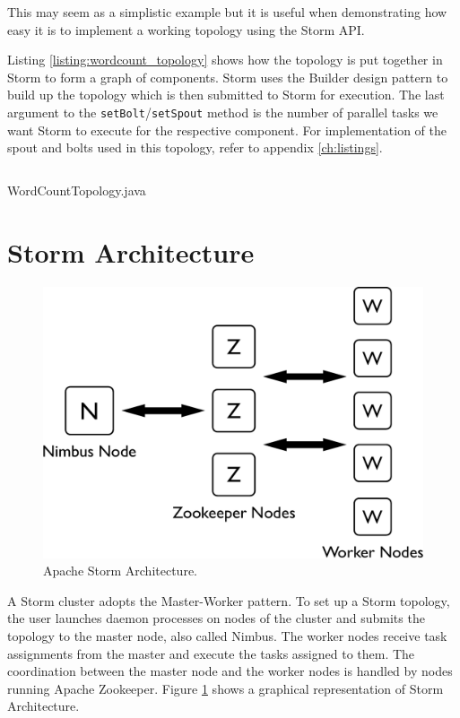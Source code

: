 \documentclass[bsc,logo,frontabs,twoside,singlespacing,normalheadings,parskip]{infthesis}\usepackage[]{graphicx}\usepackage[]{color}
\begin{document}
This may seem as a simplistic example but it is useful when demonstrating how easy it is to implement a working topology using the Storm API.

Listing \ref{listing:wordcount_topology} shows how the topology is put together in Storm to form a graph of components. Storm uses the Builder design pattern \citep{gamma1994design} to build up the topology which is then submitted to Storm for execution. The last argument to the \texttt{setBolt}/\texttt{setSpout} method is the number of parallel tasks we want Storm to execute for the respective component. For implementation of the spout and bolts used in this topology, refer to appendix \ref{ch:listings}.

\begin{listing}[!htb]
\inputminted{java}{code/WordCountTopology.java}
\caption{WordCountTopology.java}
\label{listing:wordcount_topology}
\end{listing}

\section{Storm Architecture}
\label{sec:storm_arch}

\begin{figure}[!htb]
	\centering
	\includegraphics[scale=0.4]{pdf/storm_arch.pdf}
	\caption{Apache Storm Architecture.}
	\label{fig:storm_arch}
\end{figure}


A Storm cluster adopts the Master-Worker pattern. To set up a Storm topology, the user launches daemon processes on nodes of the cluster and submits the topology to the master node, also called Nimbus. The worker nodes receive task assignments from the master and execute the tasks assigned to them. The coordination between the master node and the worker nodes is handled by nodes running Apache Zookeeper. Figure \ref{fig:storm_arch} shows a graphical representation of Storm Architecture.
\end{document}
